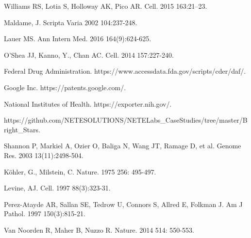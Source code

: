 \documentclass[10pt,letterpaper]{article}
\begin{document}
\begin{thebibliography}{10}

Williams RS, Lotia S, Holloway AK, Pico AR.
\newblock Cell. 2015 163:21--23.

Maldame, J.
\newblock Scripta Varia 2002 104:237-248.

Lauer MS.
\newblock Ann Intern Med. 2016 164(9):624-625.

O'Shea JJ, Kanno, Y., Chan AC.
\newblock Cell. 2014 157:227-240.

Federal Drug Administration.
\newblock https://www.accessdata.fda.gov/scripts/cder/daf/.

Google Inc.
\newblock https://patents.google.com/.

National Institutes of Health.
\newblock https://exporter.nih.gov/.

\newblock https://github.com/NETESOLUTIONS/NETELabs\_CaseStudies/tree/master/Bright\_Stars.

Shannon P, Markiel A, Ozier O, Baliga N, Wang JT, Ramage D, et al.
\newblock Genome Res. 2003 13(11):2498-504.

K\"ohler, G., Milstein, C.
\newblock Nature. 1975 256: 495-497.

Levine, AJ.
\newblock Cell. 1997 88(3):323-31.

Perez-Atayde AR, Sallan SE, Tedrow U, Connors S, Allred E, Folkman J.
\newblock Am J Pathol. 1997 150(3):815-21.

Van Noorden R, Maher B, Nuzzo R.
\newblock Nature. 2014 514: 550-553. 


\end{thebibliography}
\end{document}
